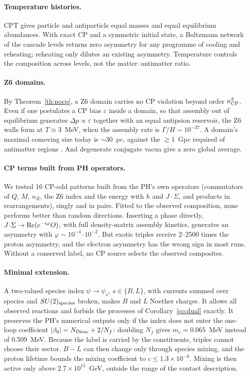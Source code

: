 \documentclass[11pt]{article}
\begin{document}
\paragraph{Temperature histories.} CPT gives particle and antiparticle equal masses and equal equilibrium abundances. With exact CP and a symmetric initial state, a Boltzmann network of the cascade levels returns zero asymmetry for any programme of cooling and reheating; reheating only dilutes an existing asymmetry. Temperature controls the composition across levels, not the matter--antimatter ratio.

\paragraph{Z6 domains.} By Theorem~\ref{th:nocp}, a Z6 domain carries no CP violation beyond order $\kappa_{\rm CP}^2$. Even if one postulates a CP bias $\varepsilon$ inside a domain, so that assembly out of equilibrium generates $\Delta p\propto\varepsilon$ together with an equal antipsion reservoir, the Z6 walls form at $T\approx3$~MeV, when the assembly rate is $\Gamma/H\sim10^{-37}$. A domain's maximal comoving size today is $\sim30$~pc, against the $\gtrsim1$~Gpc required of antimatter regions \cite{cdg}. And degenerate conjugate vacua give a zero global average.

\paragraph{CP terms built from PH operators.} We tested 16 CP-odd patterns built from the PH's own operators (commutators of $Q$, $M$, $n_R$, the Z6 index and the energy with $h$ and $J\!\cdot\!\Sigma$, and products in rearrangements), singly and in pairs. Fitted to the observed composition, none performs better than random directions. Inserting a phase directly, $J\!\cdot\!\Sigma\to{\rm Re}(e^{-i\varphi}O)$, with full density-matrix assembly kinetics, generates an asymmetry with $\varphi\sim10^{-4}$--$10^{-2}$. But exotic triples receive 2--2500 times the proton asymmetry, and the electron asymmetry has the wrong sign in most runs. Without a conserved label, no CP source selects the observed composites.

\paragraph{Minimal extension.} A two-valued species index $\psi\to\psi_s$, $s\in\{B,L\}$, with currents summed over species and $SU(2)_{\rm species}$ broken, makes $B$ and $L$ Noether charges. It allows all observed reactions and forbids the processes of Corollary~\ref{co:dual} exactly. It preserves the PH's numerical outputs only if the index does not enter the one-loop coefficient $|\beta_0|=N_{\rm Dirac}+2/N_f$: doubling $N_f$ gives $m_e=0.065$~MeV instead of 0.509~MeV. Because the label is carried by the constituents, triples cannot choose their sector. $B-L$ can then change only through species mixing, and the proton lifetime bounds the mixing coefficient to $c\le1.3\times10^{-8}$. Mixing is then active only above $2.7\times10^{15}$~GeV, outside the range of the contact description.
\end{document}
